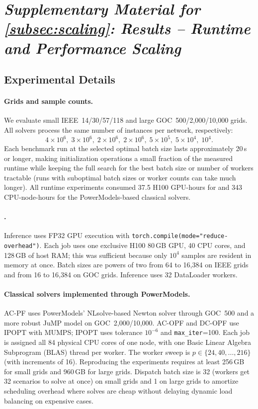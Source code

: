\section{\textit{Supplementary Material for \cref{subsec:scaling}: Results -- Runtime and Performance Scaling}}
\label{app:runtime_details}


\subsection{Experimental Details}

\paragraph{Grids and sample counts.}
We evaluate small IEEE~14/30/57/118 and large GOC~500/2{,}000/10{,}000 grids. All solvers process the same number of instances per network, respectively:
\[
4\times10^{6},\;
3\times10^{6},\;
2\times10^{6},\;
2\times10^{6},\;
5\times10^{5},\;
5\times10^{4},\;
10^{4}.
\]
Each benchmark run at the selected optimal batch size lasts approximately 20\,s or longer, making initialization operations a small fraction of the measured runtime while keeping the full search for the best batch size or number of workers tractable (runs with suboptimal batch sizes or worker counts can take much longer). All runtime experiments consumed 37.5 H100 GPU-hours for \genco and 343 CPU-node-hours for the PowerModels-based classical solvers.

\paragraph{\genco.}
Inference uses FP32 GPU execution with \texttt{torch.compile(mode="reduce-overhead")}. Each job uses one exclusive H100 80\,GB GPU, 40 CPU cores, and 128\,GB of host RAM; this was sufficient because only $10^4$ samples are resident in memory at once. Batch sizes are powers of two from 64 to 16{,}384 on IEEE grids and from 16 to 16{,}384 on GOC grids. Inference uses 32 DataLoader workers.

\paragraph{Classical solvers implemented through PowerModels.}
AC-PF uses PowerModels' NLsolve-based Newton solver through GOC~500 and a more robust JuMP model on GOC~2{,}000/10{,}000. AC-OPF and DC-OPF use IPOPT with MUMPS; IPOPT uses tolerance $10^{-6}$ and \texttt{max\_iter}=100. Each job is assigned all 84 physical CPU cores of one node, with one Basic Linear Algebra Subprogram (BLAS) thread per worker. The worker sweep is $p\in\{24,40,\ldots,216\}$ (with increments of 16). Reproducing the experiments requires at least 256\,GB for small grids and 960\,GB for large grids. Dispatch batch size is 32 (workers get 32 scenarios to solve at once) on small grids and 1 on large grids to amortize scheduling overhead where solves are cheap without delaying dynamic load balancing on expensive cases.


